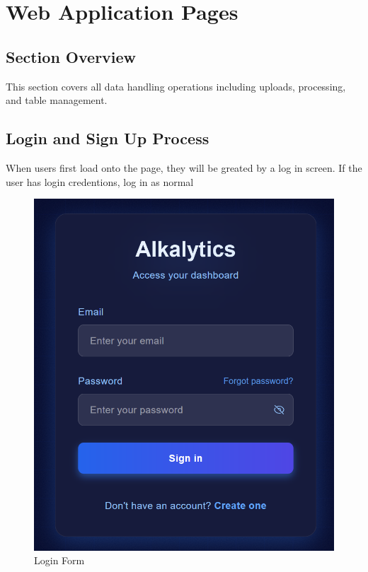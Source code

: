 \documentclass[12pt]{article}
\begin{document}
\newpage
\section{Web Application Pages}
\subsection*{Section Overview}
This section covers all data handling operations including uploads, processing,
and table management.

\subsection{Login and Sign Up Process}
When users first load onto the page, they will be greated by a log in screen. 
If the user has login credentions, log in as normal 
\begin{figure}[H]
    \centering
    \includegraphics[scale=0.55]{Images/login .png}
    \caption{Login Form}
    \label{fig:example}
\end{figure}
\end{document}
